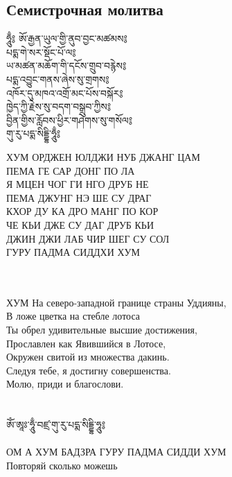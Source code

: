 \subsection*{Семистрочная молитва}

\begingroup
\parbox[t][][l]{0.40\textwidth}{
\ti ཧཱུྃ༔ ཨོ་རྒྱན་ཡུལ་གྱི་ནུབ་བྱང་མཚམས༔\\
པདྨ་གེ་སར་སྡོང་པོ་ལ༔\\
ཡ་མཚན་མཆོག་གི་དངོས་གྲུབ་བརྙེས༔\\
པདྨ་འབྱུང་གནས་ཞེས་སུ་གྲགས༔\\
འཁོར་དུ་མཁའ་འགྲོ་མང་པོས་བསྐོར༔\\
ཁྱེད་ཀྱི་རྗེས་སུ་བདག་བསྒྲུབ་ཀྱིས༔\\
བྱིན་གྱིས་རློབས་ཕྱིར་གཤེགས་སུ་གསོལ༔\\
གུ་རུ་པདྨ་སིདྡྷི་ཧཱུྃ༔\\
\ru
}
\hspace{0.2cm}
\parbox[t][][r]{0.60\textwidth}{
\small
\vspace{0.1cm}
ХУМ ОРДЖЕН ЮЛДЖИ НУБ ДЖАНГ ЦАМ\\
ПЕМА ГЕ САР ДОНГ ПО ЛА\\
Я МЦЕН ЧОГ ГИ НГО ДРУБ НЕ\\
ПЕМА ДЖУНГ НЭ ШЕ СУ ДРАГ\\
КХОР ДУ КА ДРО МАНГ ПО КОР\\
ЧЕ КЬИ ДЖЕ СУ ДАГ ДРУБ КЬИ\\
ДЖИН ДЖИ ЛАБ ЧИР ШЕГ СУ СОЛ\\
ГУРУ ПАДМА СИДДХИ ХУМ\\
}
\endgroup
\\
\\
ХУМ На северо-западной границе страны Уддияны,\\
В ложе цветка на стебле лотоса\\
Ты обрел удивительные высшие достижения,\\
Прославлен как Явившийся в Лотосе,\\
Окружен свитой из множества дакинь.\\
Следуя тебе, я достигну совершенства.\\
Молю, приди и благослови.\\
\\
\\
\ti ཨོཾ་ཨཱཿ་ཧཱུྃ་བཛྲ་གུ་རུ་པདྨ་སིདྡྷི་ཧཱུ༔\\
\\
\ru ОМ А ХУМ БАДЗРА ГУРУ ПАДМА СИДДИ ХУМ\\
\scriptsize
Повторяй сколько можешь
\normalsize


